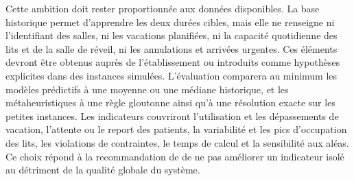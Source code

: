 Cette ambition doit rester proportionnée aux données disponibles. La base historique permet d'apprendre les deux durées cibles, mais elle ne renseigne ni l'identifiant des salles, ni les vacations planifiées, ni la capacité quotidienne des lits et de la salle de réveil, ni les annulations et arrivées urgentes. Ces éléments devront être obtenus auprès de l'établissement ou introduits comme hypothèses explicites dans des instances simulées. L'évaluation comparera au minimum les modèles prédictifs à une moyenne ou une médiane historique, et les métaheuristiques à une règle gloutonne ainsi qu'à une résolution exacte sur les petites instances. Les indicateurs couvriront l'utilisation et les dépassements de vacation, l'attente ou le report des patients, la variabilité et les pics d'occupation des lits, les violations de contraintes, le temps de calcul et la sensibilité aux aléas. Ce choix répond à la recommandation de \textcite{schouten2023} de ne pas améliorer un indicateur isolé au détriment de la qualité globale du système.
